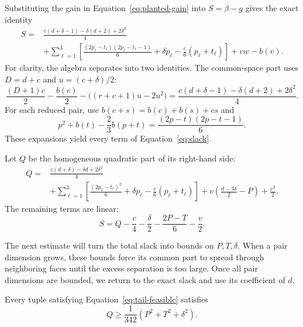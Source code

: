 Substituting the gain in Equation~\eqref{eq:planted-gain} into
$S=\beta-g$ gives the exact identity
\begin{equation}\label{eq:slack}
 \begin{split}
 S={}&\frac{c(d+\delta-1)-\delta(d+2)+2\delta^2}{4}\\
 &+\sum_{\ell=1}^3\left[
 \frac{(2p_\ell-t_\ell)(2p_\ell-t_\ell-1)}6
 +\delta p_\ell-\frac c6(p_\ell+t_\ell)\right]
 +vw-b(v).
 \end{split}
\end{equation}
For clarity, the algebra separates into two identities.  The
common-space part uses $D=d+c$ and $u=(c+\delta)/2$:
\[
 \frac{(D+1)c}{2}-\frac{b(c)}2
 -\big((r+c+1)u-2u^2\big)
 =\frac{c(d+\delta-1)-\delta(d+2)+2\delta^2}{4}.
\]
For each reduced pair, use $b(c+s)=b(c)+b(s)+cs$ and
\[
 p^2+b(t)-\frac23b(p+t)
 =\frac{(2p-t)(2p-t-1)}6.
\]
These expansions yield every term of Equation~\eqref{eq:slack}.

Let \(Q\) be the homogeneous quadratic part of its right-hand side:
\begin{equation}\label{eq:tail-quadratic}
\begin{split}
 Q={}&\frac{c(d+\delta)-\delta d+2\delta^2}{4}\\
 &+\sum_{\ell=1}^3\left[
 \frac{(2p_\ell-t_\ell)^2}{6}
 +\delta p_\ell-\frac c6(p_\ell+t_\ell)\right]
 +v\left(\frac{d-3\delta}{2}-P\right)+\frac{v^2}{2}.
\end{split}
\end{equation}
The remaining terms are linear:
\begin{equation}\label{eq:tail-linear-loss}
 S=Q-\frac c4-\frac\delta2-\frac{2P-T}{6}-\frac v2.
\end{equation}

The next estimate will turn the total slack into bounds on
\(P,T,\delta\). When a pair dimension grows, these bounds force its
common part to spread through neighboring faces until the excess
separation is too large. Once all pair dimensions are bounded, we
return to the exact slack and use its coefficient of \(d\).

\begin{lemma}[Coercivity]\label{lem:coercivity}
Every tuple satisfying Equation~\eqref{eq:tail-feasible} satisfies
\begin{equation}\label{eq:coercivity}
 Q\ge\frac1{342}(P^2+T^2+\delta^2).
\end{equation}
\end{lemma}

